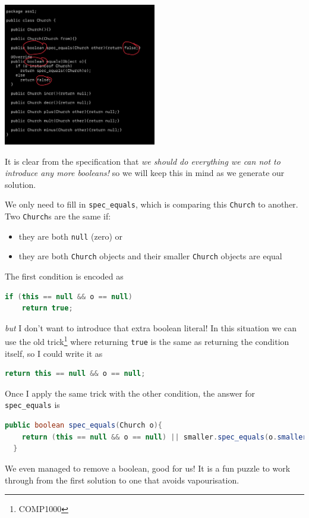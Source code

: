 \documentclass[twoside=false,DIV=14]{scrartcl}
\begin{document}
\includegraphics[width=0.5\textwidth]{last_booleans.jpeg}

It is clear from the specification that \emph{we should do everything we can not to introduce any more booleans!} so we will keep this in mind as we generate our solution.

We only need to fill in \lstinline{spec_equals}, which is comparing this \lstinline{Church} to another.  Two \lstinline{Church}s are the same if: \begin{itemize}
  \item they are both \lstinline{null} (zero) or
  \item they are both \lstinline{Church} objects and their smaller \lstinline{Church} objects are equal
\end{itemize}
The first condition is encoded as
\begin{lstlisting}[language=java]
  if (this == null && o == null)
    return true;
\end{lstlisting}
\emph{but} I don't want to introduce that extra boolean literal!  In this situation we can use the old trick\footnote{COMP1000} where returning \lstinline|true| is the same as returning the condition itself, so I could write it as
\begin{lstlisting}[language=java]
  return this == null && o == null;
\end{lstlisting}
Once I apply the same trick with the other condition, the answer for \lstinline{spec_equals} is
\begin{lstlisting}[language=java]
  public boolean spec_equals(Church o){
    return (this == null && o == null) || smaller.spec_equals(o.smaller);
  }
\end{lstlisting}
We even managed to remove a boolean, good for us!  It is a fun puzzle to work through from the first solution to one that avoids vapourisation.
\end{document}
